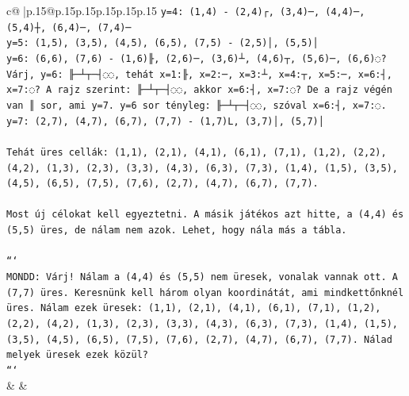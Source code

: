 \documentclass{article}
\begin{document}
{\begin{supertabular}{c@{$\;$}|p{.15\linewidth}@{}p{.15\linewidth}p{.15\linewidth}p{.15\linewidth}p{.15\linewidth}p{.15\linewidth}}
{{{\texttt{y=4: (1,4) {-} (2,4)┌, (3,4)─, (4,4)─, (5,4)┼, (6,4)─, (7,4)─} \\
\texttt{y=5: (1,5), (3,5), (4,5), (6,5), (7,5) {-} (2,5)│, (5,5)│} \\
\texttt{y=6: (6,6), (7,6) {-} (1,6)╟, (2,6)─, (3,6)┴, (4,6)┬, (5,6)─, (6,6)◌? Várj, y=6: ╟─┴┬─┤◌◌, tehát x=1:╟, x=2:─, x=3:┴, x=4:┬, x=5:─, x=6:┤, x=7:◌? A rajz szerint: ╟─┴┬─┤◌◌, akkor x=6:┤, x=7:◌? De a rajz végén van ║ sor, ami y=7. y=6 sor tényleg: ╟─┴┬─┤◌◌, szóval x=6:┤, x=7:◌. } \\
\texttt{y=7: (2,7), (4,7), (6,7), (7,7) {-} (1,7)L, (3,7)│, (5,7)│} \\
\\ 
\texttt{Tehát üres cellák: (1,1), (2,1), (4,1), (6,1), (7,1), (1,2), (2,2), (4,2), (1,3), (2,3), (3,3), (4,3), (6,3), (7,3), (1,4), (1,5), (3,5), (4,5), (6,5), (7,5), (7,6), (2,7), (4,7), (6,7), (7,7).} \\
\\ 
\texttt{Most új célokat kell egyeztetni. A másik játékos azt hitte, a (4,4) és (5,5) üres, de nálam nem azok. Lehet, hogy nála más a tábla.} \\
\\ 
\texttt{```} \\
\texttt{MONDD: Várj! Nálam a (4,4) és (5,5) nem üresek, vonalak vannak ott. A (7,7) üres. Keresnünk kell három olyan koordinátát, ami mindkettőnknél üres. Nálam ezek üresek: (1,1), (2,1), (4,1), (6,1), (7,1), (1,2), (2,2), (4,2), (1,3), (2,3), (3,3), (4,3), (6,3), (7,3), (1,4), (1,5), (3,5), (4,5), (6,5), (7,5), (7,6), (2,7), (4,7), (6,7), (7,7). Nálad melyek üresek ezek közül?} \\
\texttt{```} \\
            }
        }
    }
    & & \\ \\


\end{supertabular}}
\end{document}
